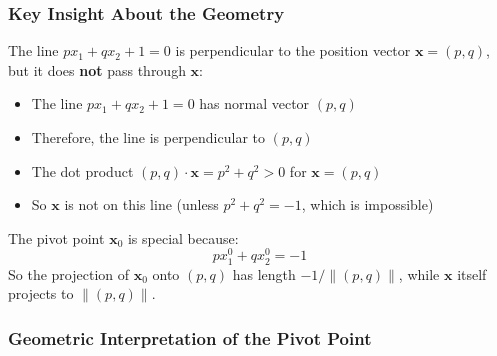 \begin{notechapter}
\begin{figure}[H]
\end{figure}

\subsubsection{Key Insight About the Geometry}

The line $p x_1 + q x_2 + 1 = 0$ is perpendicular to the position vector $\mathbf{x} = (p, q)$, but it does \textbf{not} pass through $\mathbf{x}$:

\begin{itemize}
    \item The line $p x_1 + q x_2 + 1 = 0$ has normal vector $(p, q)$
    \item Therefore, the line is perpendicular to $(p, q)$
    \item The dot product $(p, q) \cdot \mathbf{x} = p^2 + q^2 > 0$ for $\mathbf{x} = (p, q)$
    \item So $\mathbf{x}$ is not on this line (unless $p^2 + q^2 = -1$, which is impossible)
\end{itemize}

The pivot point $\mathbf{x}_0$ is special because:
\[
p x_1^0 + q x_2^0 = -1
\]
So the projection of $\mathbf{x}_0$ onto $(p, q)$ has length $-1/\|(p, q)\|$, while $\mathbf{x}$ itself projects to $\|(p, q)\|$.
\subsubsection{Geometric Interpretation of the Pivot Point}


\end{notechapter}
